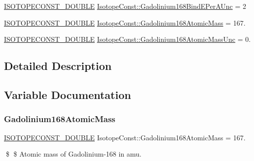 \begin{DoxyCompactItemize}
\mbox{\hyperlink{group___isotope_const-_macros_ga8f45a7272ce02c0b4c65c44636ed719a}{I\+S\+O\+T\+O\+P\+E\+C\+O\+N\+S\+T\+\_\+\+D\+O\+U\+B\+LE}} \mbox{\hyperlink{group___isotope_const-_gadolinium-_gd168_ga641890cdae73b7684db0d4c704696142}{Isotope\+Const\+::\+Gadolinium168\+Bind\+E\+Per\+A\+Unc}} = 2
\item 
\mbox{\hyperlink{group___isotope_const-_macros_ga8f45a7272ce02c0b4c65c44636ed719a}{I\+S\+O\+T\+O\+P\+E\+C\+O\+N\+S\+T\+\_\+\+D\+O\+U\+B\+LE}} \mbox{\hyperlink{group___isotope_const-_gadolinium-_gd168_ga0388ba72184fb25b67d8f16ab0477f08}{Isotope\+Const\+::\+Gadolinium168\+Atomic\+Mass}} = 167.
\item 
\mbox{\hyperlink{group___isotope_const-_macros_ga8f45a7272ce02c0b4c65c44636ed719a}{I\+S\+O\+T\+O\+P\+E\+C\+O\+N\+S\+T\+\_\+\+D\+O\+U\+B\+LE}} \mbox{\hyperlink{group___isotope_const-_gadolinium-_gd168_gaacd31945a85d59644bfb6473eccda647}{Isotope\+Const\+::\+Gadolinium168\+Atomic\+Mass\+Unc}} = 0.
\end{DoxyCompactItemize}


\subsection{Detailed Description}


\subsection{Variable Documentation}
\mbox{\label{group___isotope_const-_gadolinium-_gd168_ga0388ba72184fb25b67d8f16ab0477f08}} 
\subsubsection{\texorpdfstring{Gadolinium168\+Atomic\+Mass}{Gadolinium168AtomicMass}}
{\footnotesize\ttfamily \mbox{\hyperlink{group___isotope_const-_macros_ga8f45a7272ce02c0b4c65c44636ed719a}{I\+S\+O\+T\+O\+P\+E\+C\+O\+N\+S\+T\+\_\+\+D\+O\+U\+B\+LE}} Isotope\+Const\+::\+Gadolinium168\+Atomic\+Mass = 167.}

\$ \$ Atomic mass of Gadolinium-\/168 in amu. \mbox{\label{group___isotope_const-_gadolinium-_gd168_gaacd31945a85d59644bfb6473eccda647}} 
